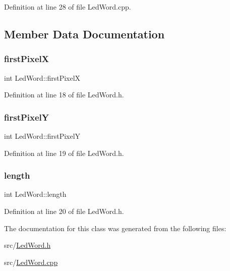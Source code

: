 Definition at line 28 of file Led\+Word.\+cpp.



\subsection{Member Data Documentation}
\mbox{\label{class_led_word_aa6052f570a53041fd3c301bd32b3f52a}} 
\subsubsection{\texorpdfstring{firstPixelX}{firstPixelX}}
{\footnotesize\ttfamily int Led\+Word\+::first\+PixelX\hspace{0.3cm}{\ttfamily [private]}}



Definition at line 18 of file Led\+Word.\+h.

\mbox{\label{class_led_word_a9b5fd331725bcdfcae12fec2ca1bd61e}} 
\subsubsection{\texorpdfstring{firstPixelY}{firstPixelY}}
{\footnotesize\ttfamily int Led\+Word\+::first\+PixelY\hspace{0.3cm}{\ttfamily [private]}}



Definition at line 19 of file Led\+Word.\+h.

\mbox{\label{class_led_word_a8c96d7c16c944052c6ef13f3b30e6385}} 
\subsubsection{\texorpdfstring{length}{length}}
{\footnotesize\ttfamily int Led\+Word\+::length\hspace{0.3cm}{\ttfamily [private]}}



Definition at line 20 of file Led\+Word.\+h.



The documentation for this class was generated from the following files\+:\begin{DoxyCompactItemize}
\item 
src/\mbox{\hyperlink{_led_word_8h}{Led\+Word.\+h}}\item 
src/\mbox{\hyperlink{_led_word_8cpp}{Led\+Word.\+cpp}}\end{DoxyCompactItemize}
